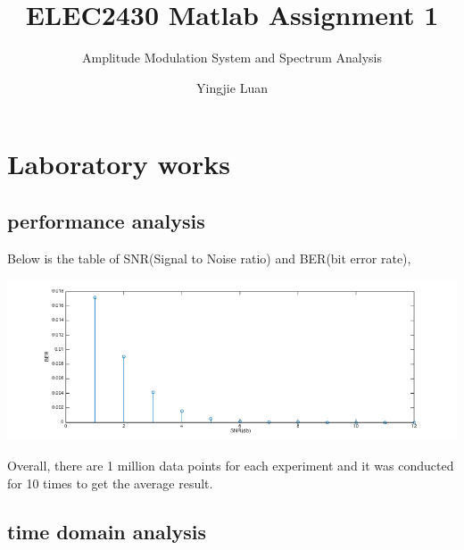 \documentclass[11pt]{scrartcl}
\begin{document}
\title{ELEC2430 Matlab Assignment 1}
\subtitle{ Amplitude Modulation System and Spectrum Analysis}
\author{Yingjie Luan}
\maketitle

\tableofcontents

\section{Laboratory works}
\subsection{performance analysis }
Below is the table of SNR(Signal to Noise ratio) and BER(bit error rate),

\FloatBarrier
{}
\FloatBarrier


\begin{minipage}[t]{\linewidth}

{
\includegraphics[scale = 0.5]{per.png}
}
\end{minipage}
\medskip

Overall, there are 1 million data points for each experiment and it was conducted for 10 times to get the average result.
\subsection{time domain analysis }
\end{document}
